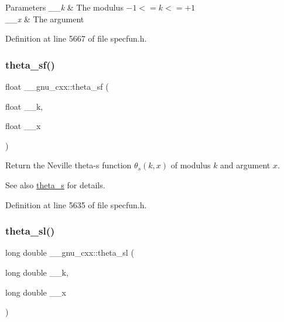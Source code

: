 \begin{DoxyParams}{Parameters}
{\em \+\_\+\+\_\+k} & The modulus $ -1 <= k <= +1 $ \\
\hline
{\em \+\_\+\+\_\+x} & The argument \\
\hline
\end{DoxyParams}


Definition at line 5667 of file specfun.\+h.

\mbox{\label{group__gnu__math__spec__func_ga5e69cf30c9a4cc057accc43e8c4bf7a3}} 
\subsubsection{\texorpdfstring{theta\+\_\+sf()}{theta\_sf()}}
{\footnotesize\ttfamily float \+\_\+\+\_\+gnu\+\_\+cxx\+::theta\+\_\+sf (\begin{DoxyParamCaption}\item[{float}]{\+\_\+\+\_\+k,  }\item[{float}]{\+\_\+\+\_\+x }\end{DoxyParamCaption})\hspace{0.3cm}{\ttfamily [inline]}}

Return the Neville theta-\/s function $ \theta_s(k,x) $ of modulus $ k $ and argument $ x $.

\begin{DoxySeeAlso}{See also}
\hyperlink{group__gnu__math__spec__func_gaf28f2dca107531890b49cccf2bdd67be}{theta\+\_\+s} for details. 
\end{DoxySeeAlso}


Definition at line 5635 of file specfun.\+h.

\mbox{\label{group__gnu__math__spec__func_gac574077067a4e7b24a0a9ff2d537d885}} 
\subsubsection{\texorpdfstring{theta\+\_\+sl()}{theta\_sl()}}
{\footnotesize\ttfamily long double \+\_\+\+\_\+gnu\+\_\+cxx\+::theta\+\_\+sl (\begin{DoxyParamCaption}\item[{long double}]{\+\_\+\+\_\+k,  }\item[{long double}]{\+\_\+\+\_\+x }\end{DoxyParamCaption})\hspace{0.3cm}{\ttfamily [inline]}}

